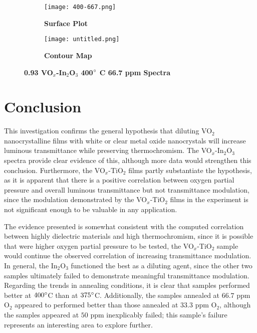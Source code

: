 \documentclass[a4paper]{article}
\begin{document}
\begin{figure*}
\centering
\begin{subfigure}{.5\textwidth}
    \centering
    \texttt{[image: 400-667.png]}
    \caption{\textbf{Surface Plot}}
    \label{surf}
\end{subfigure}%
\begin{subfigure}{.5\textwidth}
  \centering
  \texttt{[image: untitled.png]}
  \caption{\textbf{Contour Map}}
  \label{contour}
\end{subfigure}
\caption{\textbf{0.93 VO$_x$-In$_2$O$_3$ 400$\degree$ C 66.7 ppm Spectra}}
\label{3d}
\end{figure*}




\section{Conclusion}
This investigation confirms the general hypothesis that diluting VO$_2$ nanocrystalline films with white or clear metal oxide nanocrystals will increase luminous transmittance while preserving thermochromism. The VO$_x$-In$_2$O$_3$ spectra provide clear evidence of this, although more data would strengthen this conclusion. Furthermore, the VO$_x$-TiO$_2$ films partly substantiate the hypothesis, as it is apparent that there is a positive correlation between oxygen partial pressure and overall luminous transmittance but not transmittance modulation, since the modulation demonstrated by the VO$_x$-TiO$_2$ films in the experiment is not significant enough to be valuable in any application. 

The evidence presented is somewhat consistent with the computed correlation between highly dielectric materials and high thermochromism, since it is possible that were higher oxygen partial pressure to be tested, the VO$_x$-TiO$_2$ sample would continue the observed correlation of increasing transmittance modulation. In general, the In$_2$O$_3$ functioned the best as a diluting agent, since the other two samples ultimately failed to demonstrate meaningful transmittance modulation. Regarding the trends in annealing conditions, it is clear that samples performed better at $400\degree$C than at $375\degree$C. Additionally, the samples annealed at $66.7$ ppm O$_2$ appeared to performed better than those annealed at $33.3$ ppm O$_2$, although the samples appeared at $50$ ppm inexplicably failed; this sample’s failure represents an interesting area to explore further.
\end{document}
